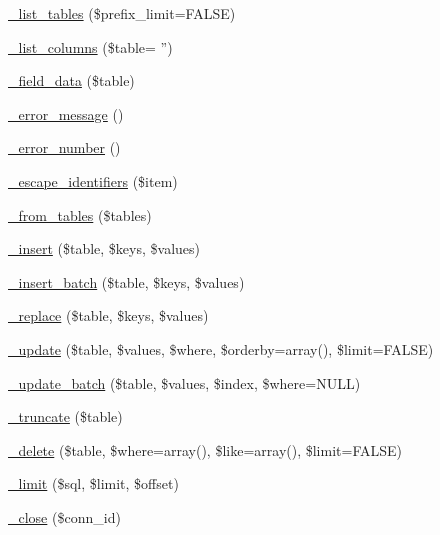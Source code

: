 \begin{DoxyCompactItemize}
\hyperlink{class_c_i___d_b__mysqli__driver_a435c0f3ce54fe7daa178baa8532ebd54}{\-\_\-list\-\_\-tables} (\$prefix\-\_\-limit=F\-A\-L\-S\-E)
\item 
\hyperlink{class_c_i___d_b__mysqli__driver_a2a81bb476a5c76fe6f763b0557c1e4c2}{\-\_\-list\-\_\-columns} (\$table= '')
\item 
\hyperlink{class_c_i___d_b__mysqli__driver_a95247d9671893adc3444cb184ad32ea1}{\-\_\-field\-\_\-data} (\$table)
\item 
\hyperlink{class_c_i___d_b__mysqli__driver_a4ca764fe1d6ad526f770f36b5f332bbb}{\-\_\-error\-\_\-message} ()
\item 
\hyperlink{class_c_i___d_b__mysqli__driver_a3e48199b3a946499b7e5fba0cdfa6b86}{\-\_\-error\-\_\-number} ()
\item 
\hyperlink{class_c_i___d_b__mysqli__driver_aeabfb3952399caa92a013621a98e3042}{\-\_\-escape\-\_\-identifiers} (\$item)
\item 
\hyperlink{class_c_i___d_b__mysqli__driver_a885a8b4372b5c099749cefa73767a744}{\-\_\-from\-\_\-tables} (\$tables)
\item 
\hyperlink{class_c_i___d_b__mysqli__driver_a69ee76b136052e0a8f06097fb388e53e}{\-\_\-insert} (\$table, \$keys, \$values)
\item 
\hyperlink{class_c_i___d_b__mysqli__driver_a1978e1358c812587a46e242630365099}{\-\_\-insert\-\_\-batch} (\$table, \$keys, \$values)
\item 
\hyperlink{class_c_i___d_b__mysqli__driver_ae0adf73984daf2d42ad29b66c484c82b}{\-\_\-replace} (\$table, \$keys, \$values)
\item 
\hyperlink{class_c_i___d_b__mysqli__driver_ae869ae2275175c5ffa22816a02099d96}{\-\_\-update} (\$table, \$values, \$where, \$orderby=array(), \$limit=F\-A\-L\-S\-E)
\item 
\hyperlink{class_c_i___d_b__mysqli__driver_acdcbd5642090362dfe49120a222670b9}{\-\_\-update\-\_\-batch} (\$table, \$values, \$index, \$where=N\-U\-L\-L)
\item 
\hyperlink{class_c_i___d_b__mysqli__driver_aa029600528fc1ce660a23ff4b4667f95}{\-\_\-truncate} (\$table)
\item 
\hyperlink{class_c_i___d_b__mysqli__driver_ace3cbc04a520b7811fc956cdb9ae1c19}{\-\_\-delete} (\$table, \$where=array(), \$like=array(), \$limit=F\-A\-L\-S\-E)
\item 
\hyperlink{class_c_i___d_b__mysqli__driver_aeeaa5cd68dc6ace010c0b8aae89c2d15}{\-\_\-limit} (\$sql, \$limit, \$offset)
\item 
\hyperlink{class_c_i___d_b__mysqli__driver_a557bd6ddde8de1f7814e10b1120efd29}{\-\_\-close} (\$conn\-\_\-id)
\end{DoxyCompactItemize}
